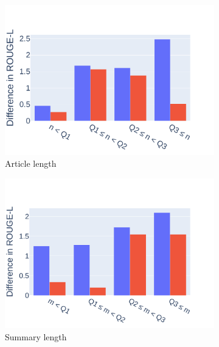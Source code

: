 \begin{figure}[ht]
    \centering
    \begin{subfigure}[b]{0.32\textwidth}
        \includegraphics[width=1\textwidth]{images/chapter5/diff_in_len_barchart_nolegend.pdf}
        \caption{Article length}
    \end{subfigure}
    \begin{subfigure}[b]{0.32\textwidth}
        \includegraphics[width=\textwidth]{images/chapter5/diff_out_len_barchart_nolegend.pdf}
        \caption{Summary length}
    \end{subfigure}
    \begin{subfigure}[b]{0.32\textwidth}

\end{subfigure}
\end{figure}

